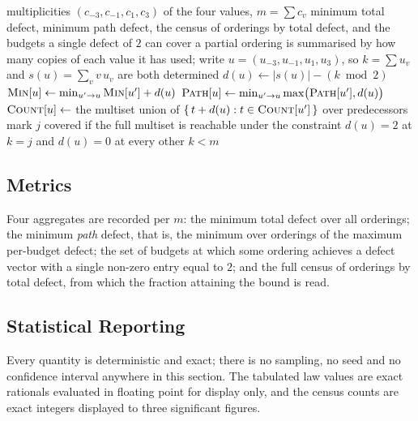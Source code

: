 \begin{algorithm}[htbp]
\caption{Exhaustive defect statistics without enumerating orderings}
\label{alg:dp}
\begin{algorithmic}[1]
\REQUIRE multiplicities $(c_{-3},c_{-1},c_{1},c_{3})$ of the four values, $m=\sum c_{v}$
\ENSURE minimum total defect, minimum path defect, the census of orderings by total
        defect, and the budgets a single defect of $2$ can cover
\STATE a partial ordering is summarised by how many copies of each value it has used;
       write $u=(u_{-3},u_{-1},u_{1},u_{3})$, so $k=\sum u_{v}$ and
       $s(u)=\sum_{v} v\,u_{v}$ are both determined
\STATE $d(u)\leftarrow|s(u)|-(k\bmod 2)$ 
  \STATE $\textsc{Min}[u]\leftarrow\min_{u'\to u}\textsc{Min}[u']+d(u)$
  \STATE $\textsc{Path}[u]\leftarrow\min_{u'\to u}\max\bigl(\textsc{Path}[u'],d(u)\bigr)$
  \STATE $\textsc{Count}[u]\leftarrow$ the multiset union of
         $\{\,t+d(u):t\in\textsc{Count}[u']\,\}$ over predecessors
\ENDFOR
{}
  \STATE mark $j$ covered if the full multiset is reachable under the constraint
         $d(u)=2$ at $k=j$ and $d(u)=0$ at every other $k<m$
\ENDFOR
\end{algorithmic}
\end{algorithm}

\subsection{Metrics}

Four aggregates are recorded per $m$: the minimum total defect over all orderings; the
minimum \emph{path} defect, that is, the minimum over orderings of the maximum per-budget
defect; the set of budgets at which some ordering achieves a defect vector with a single
non-zero entry equal to $2$; and the full census of orderings by total defect, from which the
fraction attaining the bound is read.

\subsection{Statistical Reporting}

Every quantity is deterministic and exact; there is no sampling, no seed and no confidence
interval anywhere in this section. The tabulated law values are exact rationals evaluated in
floating point for display only, and the census counts are exact integers displayed to three
significant figures.

